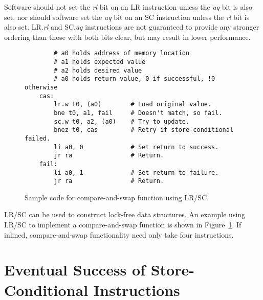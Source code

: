 Software should not set the {\em rl} bit on an LR instruction unless the {\em
aq} bit is also set, nor should software set the {\em aq} bit on an SC
instruction unless the {\em rl} bit is also set.  LR.{\em rl} and SC.{\em aq}
instructions are not guaranteed to provide any stronger ordering than those
with both bits clear, but may result in lower performance.

\begin{figure}[h!]
\begin{center}
\begin{verbatim}
        # a0 holds address of memory location 
        # a1 holds expected value
        # a2 holds desired value
        # a0 holds return value, 0 if successful, !0 otherwise
    cas:
        lr.w t0, (a0)        # Load original value.
        bne t0, a1, fail     # Doesn't match, so fail.
        sc.w t0, a2, (a0)    # Try to update.
        bnez t0, cas         # Retry if store-conditional failed.
        li a0, 0             # Set return to success.
        jr ra                # Return.
    fail:
        li a0, 1             # Set return to failure.
        jr ra                # Return.
\end{verbatim}
\end{center}
\caption{Sample code for compare-and-swap function using LR/SC.}
\label{cas}
\end{figure}

LR/SC can be used to construct lock-free data structures.  An example
using LR/SC to implement a compare-and-swap function is shown in
Figure~\ref{cas}.  If inlined, compare-and-swap functionality need
only take four instructions.

\section{Eventual Success of Store-Conditional Instructions}
\label{sec:lrscseq}

